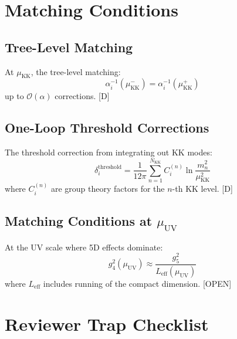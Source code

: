 \documentclass[11pt,a4paper]{article}
\begin{document}
\section{Matching Conditions}
\label{sec:matching}

\subsection{Tree-Level Matching}

At $\mu_{\text{KK}}$, the tree-level matching:
\begin{equation}
\alpha_i^{-1}(\mu_{\text{KK}}^-) = \alpha_i^{-1}(\mu_{\text{KK}}^+)
\label{eq:tree-match}
\end{equation}
up to $\mathcal{O}(\alpha)$ corrections. [D]

\subsection{One-Loop Threshold Corrections}

The threshold correction from integrating out KK modes:
\begin{equation}
\delta_i^{\text{threshold}} = \frac{1}{12\pi} \sum_{n=1}^{N_{\text{KK}}} C_i^{(n)} \ln\frac{m_n^2}{\mu_{\text{KK}}^2}
\label{eq:threshold-corr}
\end{equation}
where $C_i^{(n)}$ are group theory factors for the $n$-th KK level. [D]

\subsection{Matching Conditions at $\mu_{\text{UV}}$}

At the UV scale where 5D effects dominate:
\begin{equation}
g_4^2(\mu_{\text{UV}}) \approx \frac{g_5^2}{L_{\text{eff}}(\mu_{\text{UV}})}
\label{eq:uv-match}
\end{equation}
where $L_{\text{eff}}$ includes running of the compact dimension. [OPEN]

\section{Reviewer Trap Checklist}
\label{sec:traps}
\end{document}
